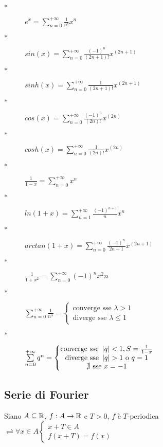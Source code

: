 \begin{description}
	\item[$\ast$] $e^x=\sum\limits_{n=0}^{+\infty}\frac{1}{n!}x^n$
	\item[$\ast$] $sin(x)=\sum\limits_{n=0}^{+\infty}\frac{(-1)^n}{(2n+1)!}x^{(2n+1)}$
	\item[$\ast$] $sinh(x)=\sum\limits_{n=0}^{+\infty}\frac{1}{(2n+1)!}x^{(2n+1)}$
	\item[$\ast$] $cos(x)=\sum\limits_{n=0}^{+\infty}\frac{(-1)^n}{(2n)!}x^{(2n)}$
	\item[$\ast$] $cosh(x)=\sum\limits_{n=0}^{+\infty}\frac{1}{(2n)!}x^{(2n)}$
	\item[$\ast$] $\frac{1}{1-x}=\sum\limits_{n=0}^{+\infty}x^n$
	\item[$\ast$] $ln(1+x)=\sum\limits_{n=1}^{+\infty}\frac{(-1)^{n+1}}{n}x^n$
	\item[$\ast$] $arctan(1+x)=\sum\limits_{n=0}^{+\infty}\frac{(-1)^{n}}{2n+1}x^{(2n+1)}$
	\item[$\ast$] $\frac{1}{1+x^2}=\sum\limits_{n=0}^{+\infty}(-1)^nx^2n$
	\item[$\ast$] $\sum\limits_{n=0}^{+\infty}\frac{1}{n^\lambda}=\left\{\begin{matrix}\text{converge sse } \lambda >1\\ \text{diverge sse } \lambda \le 1 \end{matrix}\right.$
	\item[$\ast$] $\sum\limits_{n=0}^{+\infty}q^n=\left\{\begin{matrix}\text{converge sse } \abs{q}<1, S=\frac{1}{1-x}\\ \text{diverge sse } \abs{q}>1\text{ o }q=1\\\nexists \text{ sse } x=-1 \end{matrix}\right.$
\end{description}


\subsection{Serie di Fourier}
Siano $A\subseteq \mathbb{R}$, $f:A\to \mathbb{R}$ e $T>0$, $f$ è $T$-periodica $\rightleftharpoons \forall x\in A
\left\{\begin{matrix}
x+T\in A\\f(x+T)=f(x)
\end{matrix}\right. $\\


